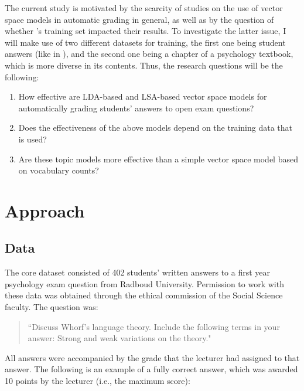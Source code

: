 \documentclass[a4paper,10pt,twoside]{article}
\begin{document}
The current study is motivated by the scarcity of studies on the use of vector space models in automatic grading in general, as well as by the question of whether 's training set impacted their results. To investigate the latter issue, I will make use of two different datasets for training, the first one being student answers (like in ), and the second one being a chapter of a psychology textbook, which is more diverse in its contents. Thus, the research questions will be the following:

\begin{enumerate}
\item How effective are LDA-based and LSA-based vector space models for automatically grading students' answers to open exam questions?
\item Does the effectiveness of the above models depend on the training data that is used?
\item Are these topic models more effective than a simple vector space model based on vocabulary counts?
\end{enumerate}

\section{Approach}

\subsection{Data}
The core dataset consisted of 402 students' written answers to a first year psychology exam question from Radboud University. Permission to work with these data was obtained through the ethical commission of the Social Science faculty. The question was: 

\begin{quote}
	``Discuss Whorf's language theory. Include the following terms in your answer: Strong and weak variations on the theory." 
\end{quote}

All answers were accompanied by the grade that the lecturer had assigned to that answer. The following is an example of a fully correct answer, which was awarded 10 points by the lecturer (i.e., the maximum score): 
\end{document}
